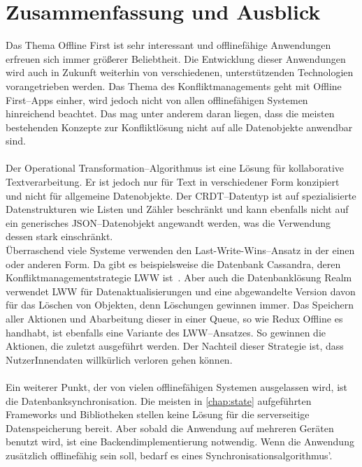 \chapter{\label{chap:fazit}Zusammenfassung und Ausblick}
Das Thema Offline First ist sehr interessant und offlinefähige Anwendungen erfreuen sich immer größerer Beliebtheit.
Die Entwicklung dieser Anwendungen wird auch in Zukunft weiterhin von verschiedenen, unterstützenden Technologien vorangetrieben werden.
Das Thema des Konfliktmanagements geht mit Offline First--\glspl{App} einher, wird jedoch nicht von allen offlinefähigen Systemen hinreichend beachtet.
Das mag unter anderem daran liegen, dass die meisten bestehenden Konzepte zur Konfliktlösung nicht auf alle Datenobjekte anwendbar sind.\\\\
Der Operational Transformation--Algorithmus ist eine Lösung für kollaborative Textverarbeitung. Er ist jedoch nur für Text in verschiedener Form konzipiert und nicht für allgemeine Datenobjekte.
Der \gls{CRDT}--Datentyp ist auf spezialisierte Datenstrukturen wie Listen und Zähler beschränkt und kann ebenfalls nicht auf ein generisches \gls{JSON}--Datenobjekt angewandt werden, was die Verwendung dessen stark einschränkt.\\
Überraschend viele Systeme verwenden den Last-Write-Wins--Ansatz in der einen oder anderen Form.
Da gibt es beispielsweise die Datenbank Cassandra, deren Konfliktmanagementstrategie \gls{LWW} ist~\cite{cassandralww}.
Aber auch die Datenbanklösung Realm verwendet \gls{LWW} für Datenaktualisierungen und eine abgewandelte Version davon für das Löschen von Objekten, denn Löschungen gewinnen immer.
Das Speichern aller Aktionen und Abarbeitung dieser in einer \gls{Queue}, so wie Redux Offline es handhabt, ist ebenfalls eine Variante des \gls{LWW}--Ansatzes.
So gewinnen die Aktionen, die zuletzt ausgeführt werden.
Der Nachteil dieser Strategie ist, dass NutzerInnendaten willkürlich verloren gehen können.\\\\
%
%
%
Ein weiterer Punkt, der von vielen offlinefähigen Systemen ausgelassen wird, ist die Datenbanksynchronisation.
Die meisten in \autoref{chap:state} aufgeführten Frameworks und Bibliotheken stellen keine Lösung für die serverseitige Datenspeicherung bereit. 
Aber sobald die Anwendung auf mehreren Geräten benutzt wird, ist eine Backendimplementierung notwendig.
Wenn die Anwendung zusätzlich offlinefähig sein soll, bedarf es eines Synchronisationsalgorithmus'.
